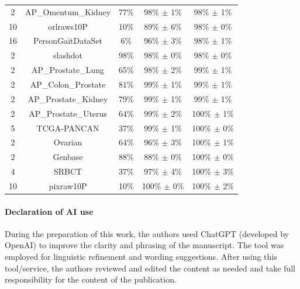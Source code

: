\documentclass[preprint,12pt,authoryear]{elsarticle}
\begin{document}
{\begin{longtable}{|c|c|c|c|c|}
2 & AP\_Omentum\_Kidney & 77\% & 98\% $\pm$ 1\% & 98\% $\pm$ 1\% \\
10 & orlraws10P & 10\% & 89\% $\pm$ 6\% & 98\% $\pm$ 0\% \\
16 & PersonGaitDataSet & 6\% & 96\% $\pm$ 3\% & 98\% $\pm$ 1\% \\
2 & slashdot & 98\% & 98\% $\pm$ 0\% & 98\% $\pm$ 0\% \\
2 & AP\_Prostate\_Lung & 65\% & 98\% $\pm$ 2\% & 99\% $\pm$ 1\% \\
2 & AP\_Colon\_Prostate & 81\% & 99\% $\pm$ 1\% & 99\% $\pm$ 1\% \\
2 & AP\_Prostate\_Kidney & 79\% & 99\% $\pm$ 1\% & 99\% $\pm$ 1\% \\
2 & AP\_Prostate\_Uterus & 64\% & 99\% $\pm$ 2\% & 100\% $\pm$ 1\% \\
5 & TCGA-PANCAN & 37\% & 99\% $\pm$ 1\% & 100\% $\pm$ 0\% \\
2 & Ovarian & 64\% & 96\% $\pm$ 3\% & 100\% $\pm$ 1\% \\
2 & Genbase & 88\% & 88\% $\pm$ 0\% & 100\% $\pm$ 0\% \\
4 & SRBCT & 37\% & 97\% $\pm$ 4\% & 100\% $\pm$ 3\% \\
10 & pixraw10P & 10\% & 100\% $\pm$ 0\% & 100\% $\pm$ 2\% \\
\end{longtable}

}

\paragraph{\bf Declaration of AI use}
During the preparation of this work, the authors used ChatGPT (developed by OpenAI) to improve the clarity and phrasing of the manuscript. The tool was employed for linguistic refinement and wording suggestions. After using this tool/service, the authors reviewed and edited the content as needed and take full responsibility for the content of the publication.




\end{document}
